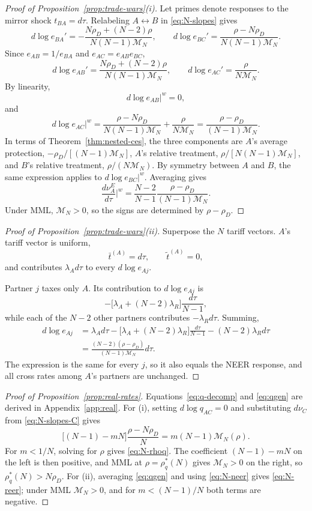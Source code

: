 \documentclass[11pt]{article}
\begin{document}
\begin{proof}[Proof of Proposition~\ref{prop:trade-wars}(i)]
Let primes denote responses to the mirror shock $t_{BA}=d\tau$. Relabeling $A\leftrightarrow B$ in \eqref{eq:N-slopes} gives
\[
d\log e_{BA}' = -\frac{N\rho_D+(N-2)\rho}{N(N-1)\mathcal M_N},
\qquad
d\log e_{BC}' = \frac{\rho-N\rho_D}{N(N-1)\mathcal M_N}.
\]
Since $e_{AB}=1/e_{BA}$ and $e_{AC}=e_{AB}e_{BC}$,
\[
d\log e_{AB}' = \frac{N\rho_D+(N-2)\rho}{N(N-1)\mathcal M_N},
\qquad
d\log e_{AC}' = \frac{\rho}{N\mathcal M_N}.
\]
By linearity,
\[
d\log e_{AB}\big|^w = 0,
\]
and
\[
d\log e_{AC}\big|^w = \frac{\rho-N\rho_D}{N(N-1)\mathcal M_N} + \frac{\rho}{N\mathcal M_N} = \frac{\rho-\rho_D}{(N-1)\mathcal M_N}.
\]
In terms of Theorem~\ref{thm:nested-ces}, the three components are $A$'s average protection, $-\rho_D/[(N-1)\mathcal M_N]$, $A$'s relative treatment, $\rho/[N(N-1)\mathcal M_N]$, and $B$'s relative treatment, $\rho/(N\mathcal M_N)$.
By symmetry between $A$ and $B$, the same expression applies to $d\log e_{BC}|^w$. Averaging gives
\[
\frac{d\nu_A^E}{d\tau}\bigg|^w = \frac{N-2}{N-1} \frac{\rho-\rho_D}{(N-1)\mathcal M_N}.
\]
Under MML, $\mathcal M_N>0$, so the signs are determined by $\rho-\rho_D$.
\end{proof}

\begin{proof}[Proof of Proposition~\ref{prop:trade-wars}(ii)]
Superpose the $N$ tariff vectors. $A$'s tariff vector is uniform,
\[
\bar t^{(A)} = d\tau,
\qquad
\tilde t^{(A)} = 0,
\]
and contributes $\lambda_Ad\tau$ to every $d\log e_{Aj}$.

Partner $j$ taxes only $A$. Its contribution to $d\log e_{Aj}$ is
\[
-\big[ \lambda_A+(N-2)\lambda_R \big] \frac{d\tau}{N-1},
\]
while each of the $N-2$ other partners contributes $-\lambda_Rd\tau$. Summing,
\[
\begin{aligned}
d\log e_{Aj}
&=
\lambda_Ad\tau
-
\big[
\lambda_A+(N-2)\lambda_R
\big]
\frac{d\tau}{N-1}
-
(N-2)\lambda_Rd\tau\\
&=
\frac{(N-2)(\rho-\rho_D)}{(N-1)\mathcal M_N}d\tau.
\end{aligned}
\]
The expression is the same for every $j$, so it also equals the NEER response, and all cross rates among $A$'s partners are unchanged.
\end{proof}

\begin{proof}[Proof of Proposition~\ref{prop:real-rates}]
Equations~\eqref{eq:q-decomp} and \eqref{eq:qgen} are derived in Appendix~\ref{app:real}. For (i), setting $d\log q_{AC}=0$ and substituting $d\nu_C$ from \eqref{eq:N-slopes-C} gives
\[
\big[ (N-1)-mN \big] \frac{\rho-N\rho_D}{N} = m(N-1)\mathcal M_N(\rho).
\]
For $m<1/N$, solving for $\rho$ gives \eqref{eq:N-rhoq}. The coefficient $(N-1)-mN$ on the left is then positive, and MML at $\rho=\rho_q^*(N)$ gives $\mathcal M_N>0$ on the right, so $\rho_q^*(N)>N\rho_D$. For (ii), averaging \eqref{eq:qgen} and using \eqref{eq:N-neer} gives \eqref{eq:N-reer}; under MML $\mathcal M_N>0$, and for $m<(N-1)/N$ both terms are negative.
\end{proof}
\end{document}
